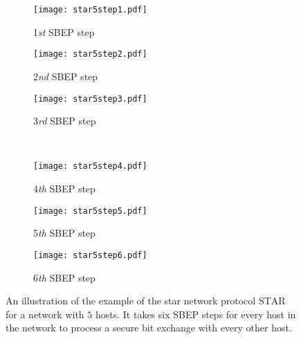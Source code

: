 \documentclass[a4paper,12pt,pdftex]{article}
\begin{document}
\begin{figure}[t]
        \centering
        \begin{subfigure}[b]{0.23\textwidth}
		\caption{1\textit{st} SBEP step}
                \texttt{[image: star5step1.pdf]}
                \label{fig:step1}
        \end{subfigure}\hfill \begin{subfigure}[b]{0.23\textwidth}
		\caption{2\textit{nd} SBEP step}
                \texttt{[image: star5step2.pdf]}
                \label{fig:step2}
        \end{subfigure}
        \hfill \begin{subfigure}[b]{0.23\textwidth}
		\caption{3\textit{rd} SBEP step}
                \texttt{[image: star5step3.pdf]}
                \label{fig:step3}        
        \end{subfigure}
        \\
        \begin{subfigure}[b]{0.23\textwidth}
		\caption{4\textit{th} SBEP step}
                \texttt{[image: star5step4.pdf]}
                \label{fig:step4}
        \end{subfigure}\hfill \begin{subfigure}[b]{0.23\textwidth}
		\caption{5\textit{th} SBEP step}
                \texttt{[image: star5step5.pdf]}
                \label{fig:step5}
        \end{subfigure}
        \hfill \begin{subfigure}[b]{0.23\textwidth}
		\caption{6\textit{th} SBEP step}
                \texttt{[image: star5step6.pdf]}
                \label{fig:step6}        
        \end{subfigure}
        \caption{An illustration of the example of the star network protocol $\mathrm{STAR}$ for a network with $5$ hosts. It takes six SBEP steps for every host in the network to process a secure bit exchange with every other host.}
        \label{fig:steps}
\end{figure}
\end{document}

